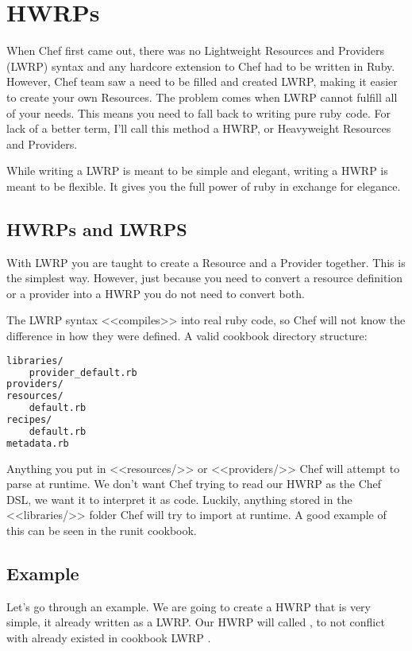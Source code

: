 \section{HWRPs}
\label{sec:cookbook-hwrp}

When Chef first came out, there was no Lightweight Resources and Providers (LWRP) syntax and any hardcore extension to Chef had to be written in Ruby. However, Chef team saw a need to be filled and created LWRP, making it easier to create your own Resources. The problem comes when LWRP cannot fulfill all of your needs. This means you need to fall back to writing pure ruby code. For lack of a better term, I'll call this method a HWRP, or Heavyweight Resources and Providers.

While writing a LWRP is meant to be simple and elegant, writing a HWRP is meant to be flexible. It gives you the full power of ruby in exchange for elegance.

\subsection{HWRPs and LWRPS}

With LWRP you are taught to create a Resource and a Provider together. This is the simplest way. However, just because you need to convert a resource definition or a provider into a HWRP you do not need to convert both.

The LWRP syntax <<compiles>> into real ruby code, so Chef will not know the difference in how they were defined. A valid cookbook directory structure:

\begin{lstlisting}[language=Bash,label=lst:cookbook-hwrp1]
libraries/
    provider_default.rb
providers/
resources/
    default.rb
recipes/
    default.rb
metadata.rb
\end{lstlisting}

Anything you put in <<resources/>> or <<providers/>> Chef will attempt to parse at runtime. We don't want Chef trying to read our HWRP as the Chef DSL, we want it to interpret it as code. Luckily, anything stored in the <<libraries/>> folder Chef will try to import at runtime. A good example of this can be seen in the runit cookbook.

\subsection{Example}

Let's go through an example. We are going to create a HWRP that is very simple, it already written as a LWRP. Our HWRP will called , to not conflict with already existed in cookbook LWRP .


